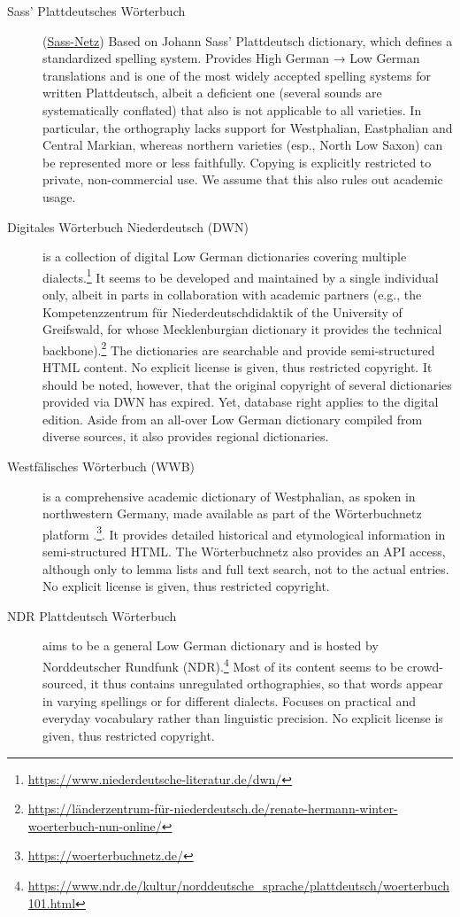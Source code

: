 \documentclass[11pt]{article}
\begin{document}
\begin{description}
\item[Sass’ Plattdeutsches Wörterbuch] (\href{https://netz.sass-platt.de/hoch-platt}{Sass-Netz})  
    Based on Johann Sass' Plattdeutsch dictionary, which defines a standardized spelling system. Provides High German → Low German translations and is one of the most widely accepted spelling systems for written Plattdeutsch, albeit a deficient one (several sounds are systematically conflated) that also is not applicable to all varieties. In particular, the orthography lacks support for Westphalian, Eastphalian and Central Markian, whereas northern varieties (esp., North Low Saxon) can be represented more or less faithfully. Copying is explicitly restricted to private, non-commercial use. We assume that this also rules out academic usage.

\item[Digitales Wörterbuch Niederdeutsch (DWN)] is a collection of digital Low German dictionaries covering multiple dialects.\footnote{\url{https://www.niederdeutsche-literatur.de/dwn/}} It seems to be developed and maintained by a single individual only, albeit in parts in collaboration with academic partners (e.g., the Kompetenzzentrum für Niederdeutschdidaktik of the University of Greifswald, for whose Mecklenburgian dictionary it provides the technical backbone).\footnote{\url{https://länderzentrum-für-niederdeutsch.de/renate-hermann-winter-woerterbuch-nun-online/}} The dictionaries are searchable and provide semi-structured HTML content. No explicit license is given, thus restricted copyright. It should be noted, however, that the original copyright of several dictionaries provided via DWN has expired. Yet, database right applies to the digital edition. Aside from an all-over Low German dictionary compiled from diverse sources, it also provides regional dictionaries.

\item[Westfälisches Wörterbuch (WWB)] is a comprehensive academic dictionary of Westphalian, as spoken in northwestern Germany, made available as part of the Wörterbuchnetz platform \cite{wwb}.\footnote{\url{https://woerterbuchnetz.de/}}. It provides detailed historical and etymological information in semi-structured HTML. The Wörterbuchnetz also provides an API access, although only to lemma lists and full text search, not to the actual entries. No explicit license is given, thus restricted copyright.

\item[NDR Plattdeutsch Wörterbuch] aims to be a general Low German dictionary and is hosted by Norddeutscher Rundfunk (NDR).\footnote{\url{https://www.ndr.de/kultur/norddeutsche_sprache/plattdeutsch/woerterbuch101.html}} Most of its content seems to be crowd-sourced, it thus contains unregulated orthographies, so that words appear in varying spellings or for different dialects. Focuses on practical and everyday vocabulary rather than linguistic precision. No explicit license is given, thus restricted copyright.


\end{description}
\end{document}
